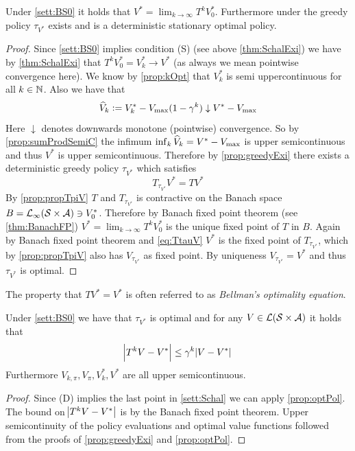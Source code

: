 \begin{prop}
  Under \cref{sett:BS0}
  it holds that $V^* = \lim_{k\to\infty} T^k V^*_0$.
  Furthermore under the greedy policy
  $\tau_{V^*}$ exists and is a deterministic
  stationary optimal policy.
  \label{prop:optPol}
\end{prop}
\begin{proof}
  Since \cref{sett:BS0} implies condition (S) (see above \cref{thm:SchalExi})
  we have by
  \cref{thm:SchalExi} that $T^k V^*_0 = V^*_k \to V^*$
  (as always we mean pointwise convergence here).
  We know by \cref{prop:kOpt} that $V^*_k$ is semi uppercontinuous for all
  $k \in \mathbb{N}$.
  Also we have that
  \[ \widehat{V}_k \vcentcolon= V^*_k - V_{\max} (1 - \gamma^k)
  \downarrow V^* - V_{\max} \]
  Here $\downarrow$ denotes downwards monotone (pointwise) convergence.
  So by \cref{prop:sumProdSemiC} the infimum
  $\inf_k \widehat{V}_k = V^* - V_{\max}$ is upper semicontinuous and thus
  $V^*$ is upper semicontinuous.
  Therefore by \cref{prop:greedyExi} there exists a deterministic
  greedy policy $\tau_{V^*}$ which satisfies
  \begin{equation} T_{\tau_{V^*}} V^* = T V^* \label{eq:TtauV} \end{equation}
  By \cref{prop:propTpiV} $T$ and $T_{\tau_{V^*}}$
  is contractive on the Banach space
  $B = \mathcal{L}_\infty(\mathcal{S} \times \mathcal{A}) \ni V^*_0$.
  Therefore by Banach fixed point theorem (see \cref{thm:BanachFP})
  $V^* = \lim_{k\to\infty} T^k V^*_0$ is the unique fixed point
  of $T$ in $B$.
  Again by Banach fixed point theorem and \cref{eq:TtauV} $V^*$ is the fixed
  point of $T_{\tau_{V^*}}$, which by \cref{prop:propTpiV} also has
  $V_{\tau_{V^*}}$ as fixed point. By uniqueness
  $V_{\tau_{V^*}} = V^*$ and thus $\tau_{V^*}$ is optimal.
\end{proof}

\begin{rem}
  The property that $TV^* = V^*$ is often referred to as
  \emph{Bellman's optimality equation}.
\end{rem}

\begin{cor}
  Under \cref{sett:BS0} we have that $\tau_{V^*}$ is optimal
  and for any $V \in \mathcal{L}(\mathcal{S} \times \mathcal{A})$ it holds that
  \[ \abs{T^k V - V^*} \leq \gamma^k \abs{V - V^*} \]
  Furthermore $V_{k, \pi}, V_\pi, V^*_k, V^*$ are all upper semicontinuous.
  \label{cor:Viteration}
\end{cor}
\begin{proof}
  Since (D) implies the last point in \cref{sett:Schal} we can apply
  \cref{prop:optPol}. The bound on $\abs{T^k V - V^*}$
  is by the Banach fixed point theorem.
  Upper semicontinuity of the policy evaluations and
  optimal value functions followed from the proofs
  of \cref{prop:greedyExi} and \cref{prop:optPol}.
\end{proof}

